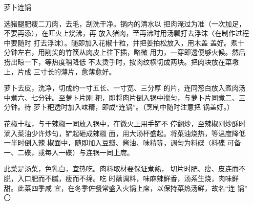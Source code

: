 \begin{recipe}{萝卜连锅}

\ingredients




\cooking

\step 	选猪腿肥瘦二刀肉，去毛，刮洗干净。锅内的清水以 把肉淹过为准（一次加足，不要再添），在旺火上烧沸，再 放入猪肉，至再沸时用汤瓢打去浮沫〈在制作过程中要随时 打去浮沫）。随即加入花椒十粒，并把姜拍松放入，用木盖 盖好。煮十分钟左右，用削尖的竹筷从肉皮上往下插，略微 用力，一穿即透便够火候。然后捞出晾一下，等热度稍降低 不太烫手时，按肉纹横切成两块。把肉块放在菜墩上，片成 三寸长的薄片，愈薄愈好。

\step 	萝卜去皮，洗净，切成约一寸五长、一寸宽、三分厚 的片，连同葱白放入煮肉汤中煮六、七分钟。至萝卜片刚 粑，即将肉片倒入锅中搅匀，与萝卜片同煮二、三分钟。待 萝卜粑透时加入味精，即成“连锅”。（烹制中随时注意把 锅盖好。）

\step 	花椒十粒，与干辣椒一同放入锅中，在微火上用手铲不 停翻炒，至辣椒刚炒酥时滴入菜油少许炒匀，铲起砸成辣椒 面，用大汤杯盛起。将菜油烧热，等温度降低一半时倒入辣 椒面中，随即加入豆瓣、酱油、味精等，调匀为料碟（料碟 可备一、二碟，或每人一碟）与连锅一同上席。

\notes

此菜是汤菜，色乳白，宜热吃。肉料取材要保证煮熟， 切片时肥、瘦、皮连而不脱，入口肥而不腻，瘦而不绵。吃 时蘸调料，味麻辣鲜香，汤系生烧，肉味鲜甜。此菜四季咸 宜，在冬季佐餐常盛入火锅上席，以保持菜热汤鲜，故名“连 锅” 〇

\end{recipe}

